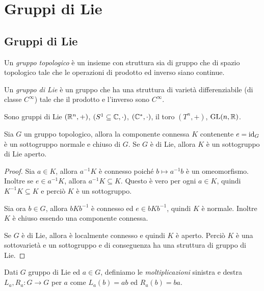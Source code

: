 \chapter{Gruppi di Lie}

\section{Gruppi di Lie}

\begin{definition} 
	Un \emph{gruppo topologico} è un insieme con struttura sia di gruppo che di spazio topologico tale che le operazioni di prodotto ed inverso siano continue.
\end{definition}

\begin{definition} 
	Un \emph{gruppo di Lie} è un gruppo che ha una struttura di varietà differenziabile (di classe $C^\infty$) tale che il prodotto e l'inverso sono $C^\infty$.
\end{definition}

\begin{example}
	Sono gruppi di Lie $(\mathbb R^n,+)$, $(S^1\subseteq \mathbb C, \cdot)$, $(\mathbb C^*,\cdot)$, il toro $(T^n, +)$, $\mathrm{GL}(n,\mathbb R)$.
\end{example}

\begin{proposition}
	Sia $G$ un gruppo topologico, allora la componente connessa $K$ contenente $e=\mathrm{id}_G$ è un sottogruppo normale e chiuso di $G$. Se $G$ è di Lie, allora $K$ è un sottogruppo di Lie aperto.
\end{proposition}
\begin{proof}
	Sia $a\in K$, allora $a^{-1}K$ è connesso poiché $b\mapsto a^{-1}b$ è un omeomorfismo.
	Inoltre se $e\in a^{-1}K$, allora $a^{-1}K\subseteq K$. Questo è vero per ogni $a\in K$, quindi $K^{-1}K\subseteq K$ e perciò $K$ è un sottogruppo.
	
	Sia ora $b\in G$, allora $bKb^{-1}$ è connesso ed $e\in bKb^{-1}$, quindi $K$ è normale. Inoltre $K$ è chiuso essendo una componente connessa.
	
	Se $G$ è di Lie, allora è localmente connesso e quindi $K$ è aperto. Perciò $K$ è una sottovarietà e un sottogruppo e di conseguenza ha una struttura di gruppo di Lie.
\end{proof}


\begin{definition} 
	Dati $G$ gruppo di Lie ed $a\in G$, definiamo le \emph{moltiplicazioni} sinistra e destra $L_a,R_a:G\to G$ per $a$ come $L_a(b) = ab$ ed $R_a(b) = ba$.
\end{definition}

